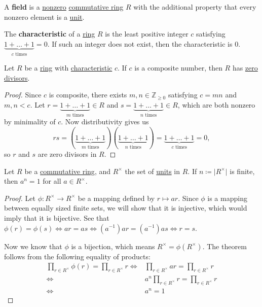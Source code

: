 \documentclass{scrartcl}
\begin{document}
\begin{definition}[Field]
    \label{def:field}
    A \textbf{field} is a \hyperref[def:nonzero ring]{nonzero} \hyperref[def:commutative ring]{commutative ring} $R$
    with the additional property that every nonzero element is a \hyperref[def:unit]{unit}.
\end{definition}

\begin{definition}[Characteristic]
    \label{def:characteristic}
    The \textbf{characteristic} of a \hyperref[def:ring]{ring} $R$ is the least positive integer $c$ satisfying
    $\underbrace{1+\dots+1}_{c\text{ times}}=0$.
    If such an integer does not exist, then the characteristic is $0$.
\end{definition}

\begin{proposition}
    Let $R$ be a \hyperref[def:ring]{ring} with \hyperref[def:characteristic]{characteristic} $c$.
    If $c$ is a composite number, then $R$ has \hyperref[def:zero divisor]{zero divisors}.
\end{proposition}

\begin{proof}
    Since $c$ is composite, there exists $m,n\in\mathbb{Z}_{\geq 0}$ satisfying $c=mn$ and $m,n<c$.
    Let $r=\underbrace{1+\dots+1}_{m\text{ times}}\in R$ and $s=\underbrace{1+\dots+1}_{n\text{ times}}\in R$, which
    are both nonzero by minimality of $c$.
    Now distributivity gives us
    \[rs=(\underbrace{1+\dots+1}_{m\text{ times}})(\underbrace{1+\dots+1}_{n\text{ times}})=\underbrace{1+\dots+1}_{c\text{ times}}=0,\]
    so $r$ and $s$ are zero divisors in $R$.
\end{proof}

\begin{theorem}[Euler]
    Let $R$ be a \hyperref[def:commutative ring]{commutative ring}, and $R^\times$ the set of
    \hyperref[def:unit]{units} in $R$.
    If $n\coloneqq\lvert R^\times\rvert$ is finite, then $a^n=1$ for all $a\in R^\times$.
\end{theorem}

\begin{proof}
    Let $\phi:R^\times\to R^\times$ be a mapping defined by $r\mapsto ar$.
    Since $\phi$ is a mapping between equally sized finite sets, we will show that it is injective, which would imply
    that it is bijective.
    See that $\phi(r)=\phi(s)\iff ar=as\iff (a^{-1})ar=(a^{-1})as\iff r=s$.

    Now we know that $\phi$ is a bijection, which means $R^\times=\phi(R^\times)$.
    The theorem follows from the following equality of products:
    \begin{align}
        \prod_{r\in R^\times}\phi(r)=\prod_{r\in R^\times}r
        \iff&\prod_{r\in R^\times}ar=\prod_{r\in R^\times}r \\
        \iff&a^n\prod_{r\in R^\times}r=\prod_{r\in R^\times}r \\
        \iff&a^n=1
    \end{align}
\end{proof}
\end{document}
